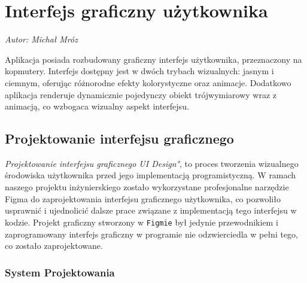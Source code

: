 \chapter{Interfejs graficzny użytkownika}
\label{chap:InterfejsGraficznyUżytkownika}
\textit{Autor: Michał Mróz}
\par Aplikacja posiada rozbudowany graficzny interfejs użytkownika, przeznaczony na kopmutery. Interfejs dostępny jest w dwóch trybach wizualnych: jasnym i ciemnym, oferując różnorodne efekty kolorystyczne oraz animacje. Dodatkowo aplikacja renderuje dynamicznie pojedynczy obiekt trójwymiarowy wraz z animacją, co wzbogaca wizualny aspekt interfejsu.

\section{Projektowanie interfejsu graficznego}
\label{sec:ProjektowanieInterfejsuGraficznego}

\emph{Projektowanie interfejsu graficznego \ang{UI Design}}, to proces tworzenia wizualnego środowiska użytkownika przed jego implementacją programistyczną. W ramach naszego projektu inżynierskiego zostało wykorzystane profesjonalne narzędzie Figma \cite{Figma} do zaprojektowania interfejsu graficznego użytkownika, co pozwoliło usprawnić i ujednolicić dalsze prace związane z implementacją tego interfejsu w kodzie. Projekt graficzny stworzony w \texttt{Figmie} był jedynie przewodnikiem i zaprogramowany interfejs graficzny w programie nie odzwierciedla w pełni tego, co zostało zaprojektowane. 


\subsection{System Projektowania}
\label{sec:SystemProjektowania}

